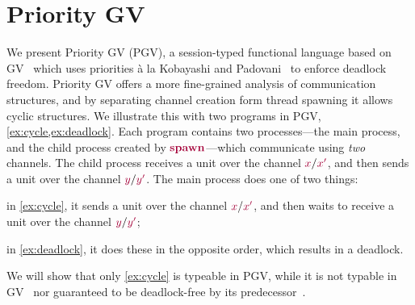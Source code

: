 \documentclass[main.tex]{subfiles}
\begin{document}
\section{Priority GV}\label{sec:pgv}

We present Priority GV (PGV), a session-typed functional language based on GV~\cite{wadler15,lindleymorris15} which uses priorities \`{a} la Kobayashi and Padovani~\cite{kobayashi06,padovaninovara15} to enforce deadlock freedom.
Priority GV offers a more fine-grained analysis of communication structures, and by separating channel creation form thread spawning it allows cyclic structures.
We illustrate this with two programs in PGV, \cref{ex:cycle,ex:deadlock}. Each program contains two processes---the main process, and the child process created by $\tm{\spawn}$---which communicate using \emph{two} channels. The child process receives a unit over the channel $\tm{x}/\tm{x'}$, and then sends a unit over the channel $\tm{y}/\tm{y'}$. The main process does one of two things:
\begin{enumerate*}[label= (\alph*) ]
\item in \cref{ex:cycle}, it sends a unit over the channel $\tm{x}/\tm{x'}$, and then waits to receive a unit over the channel $\tm{y}/\tm{y'}$;
\item in \cref{ex:deadlock}, it does these in the opposite order, which results in a deadlock.
\end{enumerate*}
We will show that only \cref{ex:cycle} is typeable in PGV, while it is not typable in GV~\cite{wadler14} nor guaranteed to be deadlock-free by its predecessor~\cite{gayvasconcelos12}.
\end{document}
